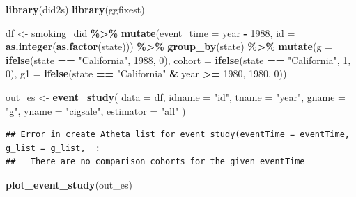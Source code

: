 \documentclass[
]{article}
\newenvironment{Shaded}{\begin{snugshade}}{\end{snugshade}}
\newcommand{\AttributeTok}[1]{\textcolor[rgb]{0.13,0.29,0.53}{#1}}
\newcommand{\DecValTok}[1]{\textcolor[rgb]{0.00,0.00,0.81}{#1}}
\newcommand{\FunctionTok}[1]{\textcolor[rgb]{0.13,0.29,0.53}{\textbf{#1}}}
\newcommand{\NormalTok}[1]{#1}
\newcommand{\OtherTok}[1]{\textcolor[rgb]{0.56,0.35,0.01}{#1}}
\newcommand{\SpecialCharTok}[1]{\textcolor[rgb]{0.81,0.36,0.00}{\textbf{#1}}}
\newcommand{\StringTok}[1]{\textcolor[rgb]{0.31,0.60,0.02}{#1}}
\begin{document}
\begin{Shaded}
\begin{Highlighting}[]
\FunctionTok{library}\NormalTok{(did2s)}
\FunctionTok{library}\NormalTok{(ggfixest)}

\NormalTok{df }\OtherTok{\textless{}{-}}\NormalTok{ smoking\_did }\SpecialCharTok{\%\textgreater{}\%}
  \FunctionTok{mutate}\NormalTok{(}\AttributeTok{event\_time =}\NormalTok{ year }\SpecialCharTok{{-}} \DecValTok{1988}\NormalTok{,}
         \AttributeTok{id =} \FunctionTok{as.integer}\NormalTok{(}\FunctionTok{as.factor}\NormalTok{(state))) }\SpecialCharTok{\%\textgreater{}\%}
  \FunctionTok{group\_by}\NormalTok{(state) }\SpecialCharTok{\%\textgreater{}\%}
  \FunctionTok{mutate}\NormalTok{(}\AttributeTok{g =} \FunctionTok{ifelse}\NormalTok{(state }\SpecialCharTok{==} \StringTok{"California"}\NormalTok{, }\DecValTok{1988}\NormalTok{, }\DecValTok{0}\NormalTok{),}
         \AttributeTok{cohort =} \FunctionTok{ifelse}\NormalTok{(state }\SpecialCharTok{==} \StringTok{"California"}\NormalTok{, }\DecValTok{1}\NormalTok{, }\DecValTok{0}\NormalTok{),}
         \AttributeTok{g1 =} \FunctionTok{ifelse}\NormalTok{(state }\SpecialCharTok{==} \StringTok{"California"} \SpecialCharTok{\&}\NormalTok{ year }\SpecialCharTok{\textgreater{}=} \DecValTok{1980}\NormalTok{, }\DecValTok{1980}\NormalTok{, }\DecValTok{0}\NormalTok{))}

\NormalTok{out\_es }\OtherTok{\textless{}{-}} \FunctionTok{event\_study}\NormalTok{(}
  \AttributeTok{data =}\NormalTok{ df,}
  \AttributeTok{idname =} \StringTok{"id"}\NormalTok{,}
  \AttributeTok{tname =} \StringTok{"year"}\NormalTok{,}
  \AttributeTok{gname =} \StringTok{"g"}\NormalTok{,}
  \AttributeTok{yname =} \StringTok{"cigsale"}\NormalTok{,}
  \AttributeTok{estimator =} \StringTok{"all"}
\NormalTok{)}
\end{Highlighting}
\end{Shaded}

\begin{verbatim}
## Error in create_Atheta_list_for_event_study(eventTime = eventTime, g_list = g_list,  : 
##   There are no comparison cohorts for the given eventTime
\end{verbatim}

\begin{Shaded}
\begin{Highlighting}[]
\FunctionTok{plot\_event\_study}\NormalTok{(out\_es)}
\end{Highlighting}
\end{Shaded}
\end{document}
